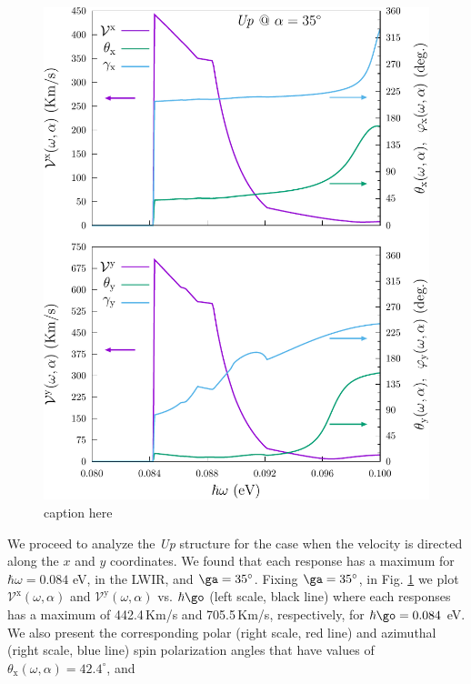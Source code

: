 \documentclass[prb,11pt,tightenlines,twocolumn,aps]{revtex4-1}
\begin{document}
\begin{figure}[t]
    \centering
    \includegraphics[width=\linewidth]{upplots/up-vx-vy-w1}
    \caption{caption here}
    \label{fig:up-vab-comp-rtp-1}
\end{figure}
We proceed to analyze the \emph{Up} structure for the case when the velocity is
directed along the $x$ and $y$ coordinates. We found that each response has a
maximum for $\hbar\omega=0.084$ eV, in the LWIR, and $\ga=35^{\circ}$.
% 
Fixing $\ga=35^{\circ}$, in Fig. \ref{fig:up-vab-comp-rtp-1} we plot
$\mathcal{V}^{\mathrm{x}} (\omega,\alpha)$ and
$\mathcal{V}^{\mathrm{y}}(\omega,\alpha)$ vs. $\hbar\go$ (left scale, black
line) where each responses has a maximum of 442.4\,Km/s and 705.5\,Km/s,
respectively, for $\hbar\go=0.084$ eV.
% 
We also present the corresponding polar (right scale, red line) and azimuthal
(right scale, blue line) spin polarization angles that have values of
% 
$\theta_{\mathrm{x}}(\omega,\alpha) = 42.4^{\circ}$, and
\end{document}
